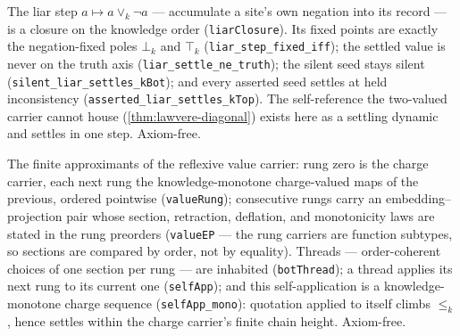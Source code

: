 \begin{theorem}\label{thm:liar-closure-settles}\leanok{}
The liar step $a \mapsto a \vee_k \neg a$ --- accumulate a site's own
negation into its record --- is a closure on the knowledge order
(\texttt{liarClosure}). Its fixed points are exactly the negation-fixed
poles $\bot_k$ and $\top_k$ (\texttt{liar\_step\_fixed\_iff}); the settled
value is never on the truth axis (\texttt{liar\_settle\_ne\_truth}); the
silent seed stays silent
(\texttt{silent\_liar\_settles\_kBot}); and every asserted seed settles at
held inconsistency (\texttt{asserted\_liar\_settles\_kTop}). The
self-reference the two-valued carrier cannot house
(\cref{thm:lawvere-diagonal}) exists here as a settling dynamic and
settles in one step. Axiom-free.
\end{theorem}

\begin{theorem}\label{thm:reflexive-tower}\leanok{}
The finite approximants of the reflexive value carrier: rung zero is the
charge carrier, each next rung the knowledge-monotone charge-valued maps
of the previous, ordered pointwise (\texttt{valueRung}); consecutive
rungs carry an embedding--projection pair whose section, retraction,
deflation, and monotonicity laws are stated in the rung preorders
(\texttt{valueEP} --- the rung carriers are function subtypes, so
sections are compared by order, not by equality). Threads ---
order-coherent choices of one section per rung --- are inhabited
(\texttt{botThread}); a thread applies its next rung to its current one
(\texttt{selfApp}); and this self-application is a knowledge-monotone
charge sequence (\texttt{selfApp\_mono}): quotation applied to itself
climbs $\le_k$, hence settles within the charge carrier's finite chain
height. Axiom-free.
\end{theorem}

